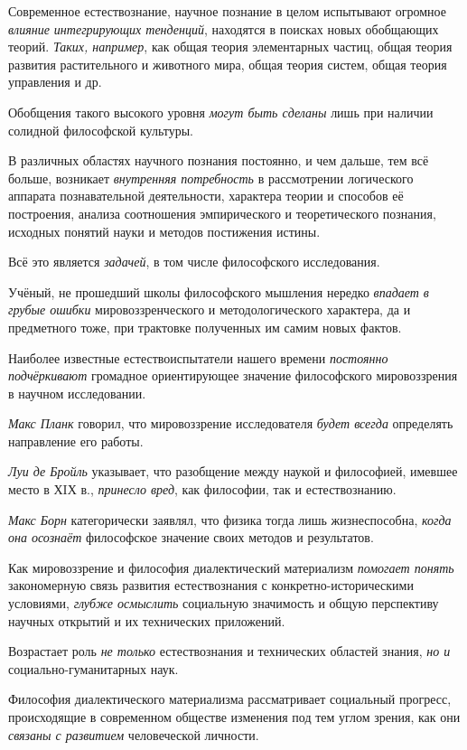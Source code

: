 \documentclass[a4paper,14pt,russian]{extreport}
\begin{document}
Современное естествознание, научное познание в целом испытывают огромное \emph{влияние интегрирующих тенденций}, находятся в поисках новых обобщающих теорий. \emph{Таких, например}, как общая теория элементарных частиц, общая теория развития растительного и животного мира, общая теория систем, общая теория управления и др.

Обобщения такого высокого уровня \emph{могут быть сделаны} лишь при наличии солидной философской культуры.

В различных областях научного познания постоянно, и чем дальше, тем всё больше, возникает \emph{внутренняя потребность} в рассмотрении логического аппарата познавательной деятельности, характера теории и способов её построения, анализа соотношения эмпирического и теоретического познания, исходных понятий науки и методов постижения истины.

Всё это является \emph{задачей}, в том числе философского исследования.

Учёный, не прошедший школы философского мышления нередко \emph{впадает в грубые ошибки} мировоззренческого и методологического характера, да и предметного тоже, при трактовке полученных им самим новых фактов.

Наиболее известные естествоиспытатели нашего времени \emph{постоянно подчёркивают} громадное ориентирующее значение философского мировоззрения в научном исследовании.

\emph{Макс Планк} говорил, что мировоззрение исследователя \emph{будет всегда} определять направление его работы.

\emph{Луи де Бройль} указывает, что разобщение между наукой и философией, имевшее место в ХIХ в., \emph{принесло вред}, как философии, так и естествознанию.

\emph{Макс Борн} категорически заявлял, что физика тогда лишь жизнеспособна, \emph{когда она осознаёт} философское значение своих методов и результатов.

Как мировоззрение и философия диалектический материализм \emph{помогает понять} закономерную связь развития естествознания с конкретно-историческими условиями, \emph{глубже осмыслить} социальную значимость и общую перспективу научных открытий и их технических приложений.

Возрастает роль \emph{не только} естествознания и технических областей знания, \emph{но и} социально-гуманитарных наук.

Философия диалектического материализма рассматривает социальный прогресс, происходящие в современном обществе изменения под тем углом зрения, как они \emph{связаны с развитием} человеческой личности.
\end{document}
